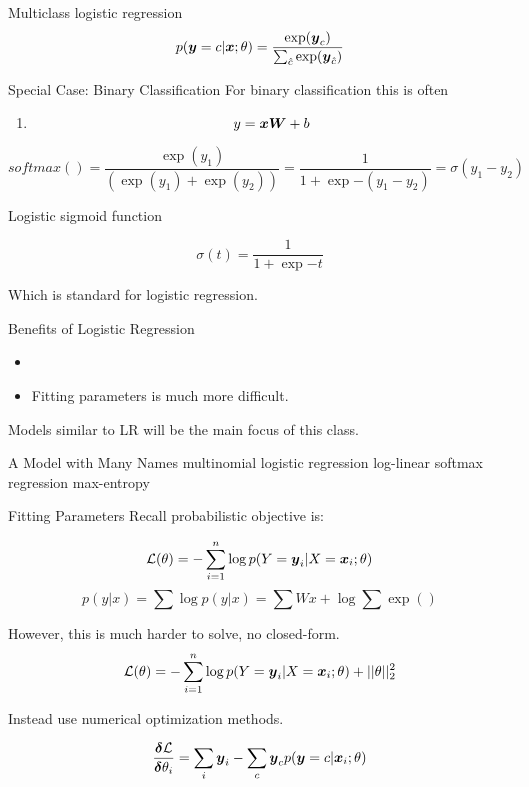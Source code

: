 \documentclass{beamer}
\begin{document}
\begin{frame}{Multiclass logistic regression}
    \[ p(\boldsymbol{y} =c | \boldsymbol{x}; \theta) = \frac{\exp(\boldsymbol{y}_c)}{\sum_{\hat{c}} \exp(\boldsymbol{y}_{\hat{c}})}   \] 
\end{frame}

\begin{frame}{Special Case: Binary Classification}
  For binary classification this is often 
  \begin{enumerate}
  \item   \[y = \boldsymbol{x} \boldsymbol{W} + b\]   
  \end{enumerate}

  \[ softmax() = \frac{\exp(y_1)}{(\exp(y_1) + \exp(y_2))} = \frac{1}{1 + \exp{-(y_1-y_2)}} = \sigma(y_1 -y_2)\]

  
  Logistic sigmoid function

  \[\sigma(t) = \frac{1}{1 + \exp{-t}} \]
  
  Which is standard for logistic regression.
\end{frame}

\begin{frame}{Benefits of Logistic Regression}
  \begin{itemize}
  \item 
  \end{itemize}
  \begin{itemize}
  \item Fitting parameters is much more difficult.
  \end{itemize}
  Models similar to LR will be the main focus of this class.
\end{frame}

\begin{frame}{A Model with Many Names}
  multinomial logistic regression
  log-linear
  softmax regression
  max-entropy
\end{frame}


\begin{frame}{Fitting Parameters}
  Recall probabilistic objective is:

  \[ \mathcal{L}(\theta) = - \sum_{i=1}^n \log p(Y = \boldsymbol{y}_i | X = \boldsymbol{x}_i; \theta) \] 
  \[ p(y | x) = \sum \log p(y| x) = \sum W x + \log \sum \exp()   \] 

  However, this is much harder to solve, no closed-form.
  \[ \mathcal{L}(\theta) = - \sum_{i=1}^n \log p(Y = \boldsymbol{y}_i | X = \boldsymbol{x}_i; \theta) + ||\theta||^2_2\] 

  Instead use numerical optimization methods.
  
  \[\frac{\boldsymbol{\delta} \mathcal{L}}{\boldsymbol{\delta} \theta_i} = \sum_i \boldsymbol{y}_i - \sum_{c} \boldsymbol{y}_c p(\boldsymbol{y} =c | \boldsymbol{x}_i ;\theta) \]
\end{frame}
\end{document}
